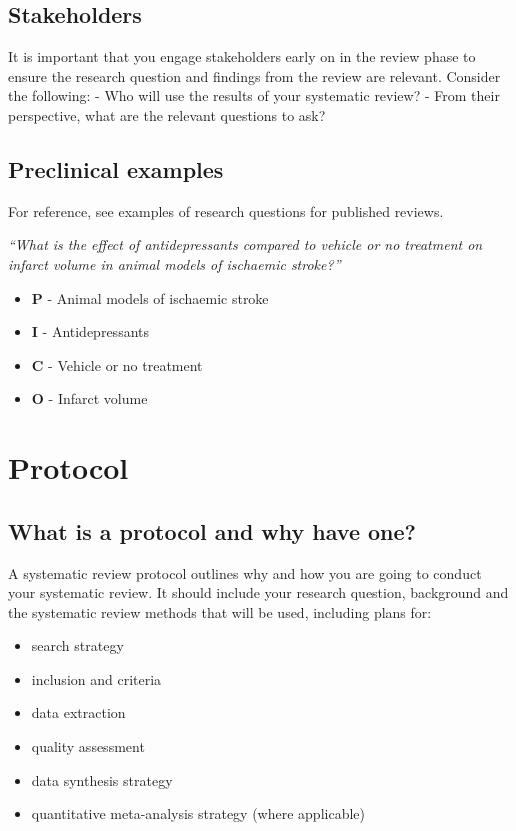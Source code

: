 \documentclass[
]{book}
\providecommand{\tightlist}{%
  \setlength{\itemsep}{0pt}\setlength{\parskip}{0pt}}
\begin{document}
\section{Stakeholders}\label{stakeholders}

It is important that you engage stakeholders early on in the review phase to ensure the research question and findings from the review are relevant. Consider the following:
- Who will use the results of your systematic review?
- From their perspective, what are the relevant questions to ask?

\section{Preclinical examples}\label{preclinical-examples}

For reference, see examples of research questions for published reviews.

\emph{``What is the effect of antidepressants compared to vehicle or no treatment on infarct volume in animal models of ischaemic stroke?''}

\begin{itemize}
\tightlist
\item
  \textbf{P} - Animal models of ischaemic stroke\\
\item
  \textbf{I} - Antidepressants
\item
  \textbf{C} - Vehicle or no treatment
\item
  \textbf{O} - Infarct volume
\end{itemize}

\chapter{Protocol}\label{protocol}

\section{What is a protocol and why have one?}\label{what-is-a-protocol-and-why-have-one}

A systematic review protocol outlines why and how you are going to conduct your systematic review. It should include your research question, background and the systematic review methods that will be used, including plans for:

\begin{itemize}
\tightlist
\item
  search strategy
\item
  inclusion and criteria
\item
  data extraction
\item
  quality assessment
\item
  data synthesis strategy
\item
  quantitative meta-analysis strategy (where applicable)
\end{itemize}
\end{document}
